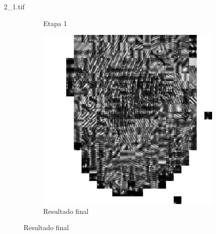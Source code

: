 \documentclass{beamer}
\begin{document}
\begin{frame}{2\_1.tif}
\begin{figure}
\begin{subfigure}[!ht]{0.32\textwidth}
                \caption{Etapa 1}
            \end{subfigure}
            \begin{subfigure}[!ht]{0.32\textwidth}
                \includegraphics[width=\columnwidth]{Fingerprints/2_1_final.jpg}
                \caption{Resultado final}
            \end{subfigure}
        \end{figure}
    \end{frame}
\end{document}
